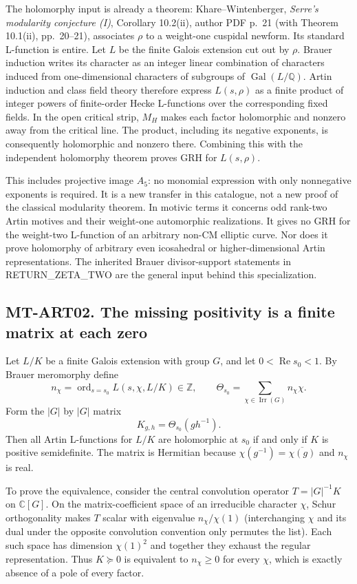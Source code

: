 \documentclass[11pt,a4paper]{article}
\begin{document}
The holomorphy input is already a theorem: Khare--Wintenberger,
\emph{Serre's modularity conjecture (I)}, Corollary 10.2(ii), author PDF
p.~21 (with Theorem 10.1(ii), pp.~20--21), associates $\rho$ to a weight-one
cuspidal newform.  Its standard L-function is entire.  Let $L$ be the finite
Galois extension cut out by $\rho$.  Brauer induction writes its character
as an integer linear combination of characters induced from
one-dimensional characters of subgroups of $\operatorname{Gal}(L/\mathbb Q)$.
Artin induction and class field theory therefore express $L(s,\rho)$ as
a finite product of integer powers of finite-order Hecke L-functions over
the corresponding fixed fields.  In the open critical strip, $M_H$ makes
each factor holomorphic and nonzero away from the critical line.  The
product, including its negative exponents, is consequently holomorphic and
nonzero there.  Combining this with the independent holomorphy theorem
proves GRH for $L(s,\rho)$.

This includes projective image $A_5$: no monomial expression with only
nonnegative exponents is required.  It is a new transfer in this catalogue,
not a new proof of the classical modularity theorem.  In motivic terms it
concerns odd rank-two Artin motives and their weight-one automorphic
realizations.  It gives no GRH for the weight-two L-function of an arbitrary
non-CM elliptic curve.  Nor does it prove holomorphy of arbitrary even
icosahedral or higher-dimensional Artin representations.  The inherited
Brauer divisor-support statements in RETURN\_ZETA\_TWO are the general
input behind this specialization.

\subsection*{MT-ART02. The missing positivity is a finite matrix at each zero}
Let $L/K$ be a finite Galois extension with group $G$, and let
$0<\operatorname{Re}s_0<1$.  By Brauer meromorphy define
\[
 n_\chi=\operatorname{ord}_{s=s_0}L(s,\chi,L/K)\in\mathbb Z,
 \qquad\Theta_{s_0}=\sum_{\chi\in\operatorname{Irr}(G)}n_\chi\chi.
\]
Form the $|G|$ by $|G|$ matrix
\[
 K_{g,h}=\Theta_{s_0}(g h^{-1}).
\]
Then all Artin L-functions for $L/K$ are holomorphic at $s_0$ if and only
if $K$ is positive semidefinite.  The matrix is Hermitian because
$\chi(g^{-1})=\overline{\chi(g)}$ and $n_\chi$ is real.

To prove the equivalence, consider the central convolution operator
$T=|G|^{-1}K$ on $\mathbb C[G]$.  On the matrix-coefficient space of an
irreducible character $\chi$, Schur orthogonality makes $T$ scalar with
eigenvalue $n_\chi/\chi(1)$ (interchanging $\chi$ and its dual under the
opposite convolution convention only permutes the list).  Each such space
has dimension $\chi(1)^2$ and together they exhaust the regular
representation.  Thus $K\succeq0$ is equivalent to $n_\chi\ge0$ for every
$\chi$, which is exactly absence of a pole of every factor.
\end{document}
